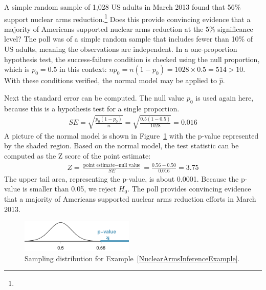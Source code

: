 \begin{example}{A simple random sample of 1,028 US adults in March 2013 found that 56\% support nuclear arms reduction.\footnote{} Does this provide convincing evidence that a majority of Americans supported nuclear arms reduction at the 5\% significance level?} \label{NuclearArmsInferenceExample}
The poll was of a simple random sample that includes fewer than 10\% of US adults, meaning the observations are independent. In a one-proportion hypothesis test, the success-failure condition is checked using the null proportion, which is $p_0 = 0.5$ in this context: $n p_0 = n (1 - p_0) = 1028 \times 0.5 = 514 > 10$. With these conditions verified, the normal model may be applied to $\hat{p}$.

Next the standard error can be computed. The null value $p_0$ is used again here, because this is a hypothesis test for a single proportion.
\begin{align*}
SE = \sqrt{\frac{p_0 (1 - p_0)}{n}} = \sqrt{\frac{0.5 (1 - 0.5)}{1028}} = 0.016
\end{align*}
A picture of the normal model is shown in Figure~\ref{nuclearArmsReductionPValue} with the p-value represented by the shaded region. Based on the normal model, the test statistic can be computed as the Z score of the point estimate:
\begin{align*}
Z = \frac{\text{point estimate} - \text{null value}}{SE} = \frac{0.56 - 0.50}{0.016} = 3.75
\end{align*}
The upper tail area, representing the p-value, is about 0.0001. Because the p-value is smaller than 0.05, we reject $H_0$. The poll provides convincing evidence that a majority of Americans supported nuclear arms reduction efforts in March 2013.
\end{example}

\begin{figure}[h]
\centering
\includegraphics[width=0.48\textwidth]{ch_inference_for_props/figures/nuclearArmsReduction/nuclearArmsReductionPValue}
\caption{Sampling distribution for Example~\ref{NuclearArmsInferenceExample}.}
\label{nuclearArmsReductionPValue}
\end{figure}

